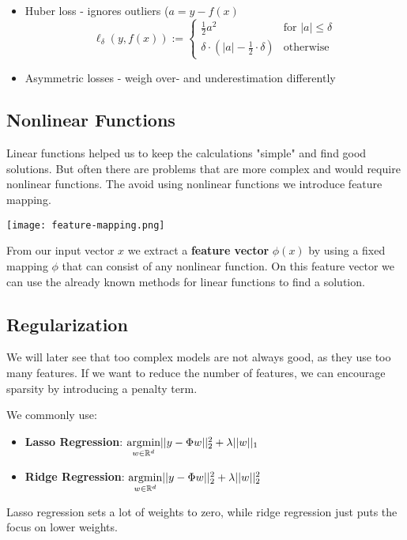 \begin{itemize}
	\item Huber loss - ignores outliers ($a = y - f(x)$
		$$\ell_\delta(y, f(x)) := \begin{cases}
			\frac{1}{2} a^2 & \text{for } |a| \leq \delta \\
			\delta \cdot (|a| - \frac{1}{2} \cdot \delta) & \text{otherwise}
		\end{cases}$$
	\item Asymmetric losses - weigh over- and underestimation differently
\end{itemize}

\subsection{Nonlinear Functions}

Linear functions helped us to keep the calculations "simple" and find good solutions. But often there are problems that are more complex and would require nonlinear functions. The avoid using nonlinear functions we introduce feature mapping. 

\texttt{[image: feature-mapping.png]}

From our input vector $x$ we extract a \textbf{feature vector} $\phi(x)$ by using a fixed mapping $\phi$ that can consist of any nonlinear function. On this feature vector we can use the already known methods for linear functions to find a solution.

\subsection{Regularization}

We will later see that too complex models are not always good, as they use too many features. If we want to reduce the number of features, we can encourage sparsity by introducing a penalty term. 

We commonly use:
\begin{itemize}
	\item \textbf{Lasso Regression}: $\underset{w \in \mathbb{R}^d}{\text{argmin}} ||y - \Phi w||_2^2 + \lambda ||w||_1$
	\item \textbf{Ridge Regression}: $\underset{w \in \mathbb{R}^d}{\text{argmin}} ||y - \Phi w||_2^2 + \lambda ||w||_2^2$
\end{itemize}

Lasso regression sets a lot of weights to zero, while ridge regression just puts the focus on lower weights.